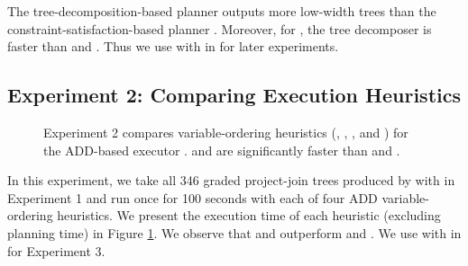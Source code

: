 The tree-decomposition-based planner \Lg{} outputs more low-width trees than the constraint-satisfaction-based planner \htb{}.
Moreover, for \Lg{}, the tree decomposer \flowcutter{} is faster than \htd{} and \tamaki{}.
Thus we use \Lg{} with \flowcutter{} in \procount{} for later experiments.


\subsection{Experiment 2: Comparing Execution Heuristics}
\begin{figure}[t]
    \centering
    
    \vspace*{-0.9cm}
    \caption{
        Experiment 2 compares variable-ordering heuristics (\mcs{}, \lexp, \lexm, and \minfill{}) for the ADD-based executor \dmc.
        \mcs{} and \lexp{} are significantly faster than \lexm{} and \minfill{}.
    }
    \label{figExecution}
\end{figure}

In this experiment, we take all 346 graded project-join trees produced by \Lg{} with \flowcutter{} in Experiment 1 %
and run \dmc{} once for 100 seconds with each of four ADD variable-ordering heuristics. 
We present the execution time of each heuristic (excluding planning time) in Figure \ref{figExecution}. 
We observe that \mcs{} and \lexp{} outperform \lexm{} and \minfill{}.
We use \dmc{} with \mcs{} in \procount{} for Experiment 3.


